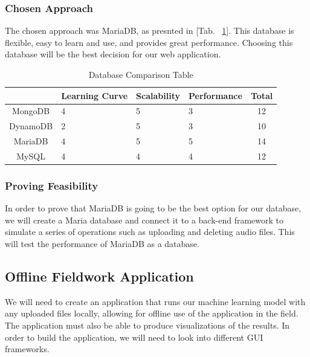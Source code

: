 \documentclass[12pt,journal,compsoc]{IEEEtran}
\newenvironment{subs}
  {\adjustwidth{1em}{0pt}}
  {\endadjustwidth}
\begin{document}
\begin{subs}
\begin{subs}
\subsubsection{Chosen Approach}
The chosen approach was MariaDB, as presnted in [Tab. ~\ref{table:data}]. This database is flexible, easy to learn and use, and provides great performance. Choosing this database will be the best decision for our web application.

\begin{table}[H]
\renewcommand{\arraystretch}{1.3}
\caption{Database Comparison Table}
\label{table:data}
\centering
\begin{tabular}{|c||m{8em}|m{8em}|m{8em}||c|}
\hline
&
Learning Curve
&
Scalability
&
Performance
&
Total\\
\hline
\hline
MongoDB & 4 & 5 & 3 & 12\\
\hline
DynamoDB & 2 & 5 & 3 & 10\\
\hline
MariaDB & 4 & 5 & 5 & 14\\
\hline
MySQL & 4 & 4 & 4 & 12\\
\hline
\end{tabular}
\end{table}

\subsubsection{Proving Feasibility}
In order to prove that MariaDB is going to be the best option for our database, we will create a Maria database and connect it to a back-end framework to simulate a series of operations such as uploading and deleting audio files. This will test the performance of MariaDB as a database.
\end{subs}

\subsection{Offline Fieldwork Application}
We will need to create an application that runs our machine learning model with any uploaded files locally, allowing for offline use of the application in the field. The application must also be able to produce visualizations of the results. In order to build the application, we will need to look into different GUI frameworks.


\end{subs}
\end{document}
